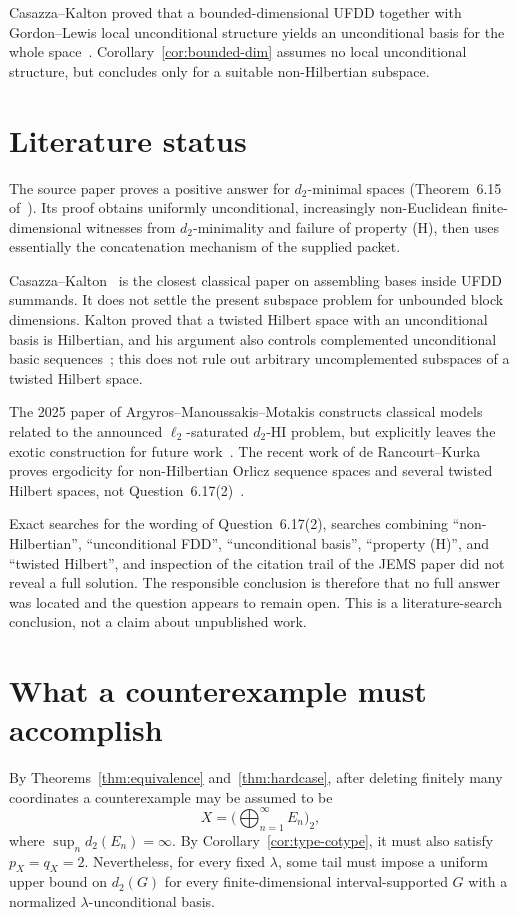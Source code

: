 \documentclass[11pt]{article}
\theoremstyle{definition}
\newcommand{\dd}{d_2}
\begin{document}
Casazza--Kalton proved that a bounded-dimensional UFDD together with
Gordon--Lewis local unconditional structure yields an unconditional basis for
the whole space~\cite{CK}.  Corollary~\ref{cor:bounded-dim} assumes no local
unconditional structure, but concludes only for a suitable non-Hilbertian
subspace.

\section{Literature status}

The source paper proves a positive answer for $d_2$-minimal spaces
(Theorem~6.15 of~\cite{CDF}).  Its proof obtains uniformly unconditional,
increasingly non-Euclidean finite-dimensional witnesses from $d_2$-minimality
and failure of property (H), then uses essentially the concatenation mechanism
of the supplied packet.

Casazza--Kalton~\cite{CK} is the closest classical paper on assembling bases
inside UFDD summands.  It does not settle the present subspace problem for
unbounded block dimensions.  Kalton proved that a twisted Hilbert space with
an unconditional basis is Hilbertian, and his argument also controls
complemented unconditional basic sequences~\cite{Kalton}; this does not rule
out arbitrary uncomplemented subspaces of a twisted Hilbert space.

The 2025 paper of Argyros--Manoussakis--Motakis constructs classical models
related to the announced $\ell_2$-saturated $d_2$-HI problem, but explicitly
leaves the exotic construction for future work~\cite{AMM}.  The recent work of
de Rancourt--Kurka proves ergodicity for non-Hilbertian Orlicz sequence spaces
and several twisted Hilbert spaces, not Question~6.17(2)~\cite{RK}.

Exact searches for the wording of Question~6.17(2), searches combining
``non-Hilbertian'', ``unconditional FDD'', ``unconditional basis'',
``property (H)'', and ``twisted Hilbert'', and inspection of the citation trail
of the JEMS paper did not reveal a full solution.  The responsible conclusion
is therefore that no full answer was located and the question appears to
remain open.  This is a literature-search conclusion, not a claim about
unpublished work.

\section{What a counterexample must accomplish}

By Theorems~\ref{thm:equivalence} and~\ref{thm:hardcase}, after deleting
finitely many coordinates a counterexample may be assumed to be
\[
  X=\Big(\bigoplus_{n=1}^\infty E_n\Big)_2,
\]
where $\sup_n\dd(E_n)=\infty$.  By Corollary~\ref{cor:type-cotype}, it must
also satisfy $p_X=q_X=2$.  Nevertheless, for every fixed $\lambda$, some tail
must impose a uniform upper bound on $\dd(G)$ for every finite-dimensional
interval-supported $G$ with a normalized $\lambda$-unconditional basis.
\end{document}
